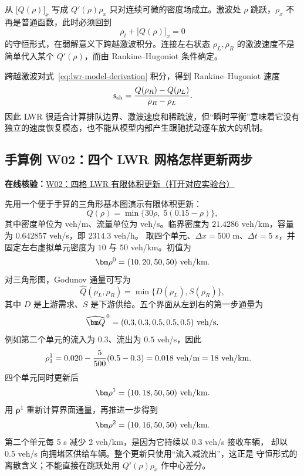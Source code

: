 \documentclass[11pt,a4paper,openany]{book}
\numberwithin{equation}{chapter}
\numberwithin{figure}{chapter}
\numberwithin{table}{chapter}
\newcommand{\onlinelab}[2]{%
  \par\smallskip\noindent
  {\small\sffamily\color{teal}\textbf{在线核验：}\href{https://cwan-ucr.github.io/traffic-stability-book/lab/?case=#1}{#2（打开对应实验台）}}%
  \par\smallskip}
\begin{document}
\begin{tcolorbox}[notebox,title=\textbf{为什么还必须保留守恒形式？}]
从 $\bigl[Q(\rho)\bigr]_x$ 写成 $Q'(\rho)\rho_x$ 只对连续可微的密度场成立。激波处 $\rho$ 跳跃，$\rho_x$ 不再是普通函数，此时必须回到
\[
\rho_t+\bigl[Q(\rho)\bigr]_x=0
\]
的守恒形式，在弱解意义下跨越激波积分。连接左右状态 $\rho_L,\rho_R$ 的激波速度不是简单代入某个 $Q'(\rho)$，而由 Rankine--Hugoniot 条件确定。
\end{tcolorbox}
跨越激波对式~\eqref{eq:lwr-model-derivation} 积分，得到 Rankine--Hugoniot 速度
\begin{equation}
s_{\rm sh}
=\frac{Q(\rho_R)-Q(\rho_L)}{\rho_R-\rho_L}.
\label{eq:lwr-rh-model}
\end{equation}
因此 LWR 很适合计算排队边界、激波速度和稀疏波，但“瞬时平衡”意味着它没有独立的速度恢复模态，也不能从模型内部产生跟驰扰动逐车放大的机制。

\subsection{手算例 W02：四个 LWR 网格怎样更新两步}
\onlinelab{W02}{W02：四格 LWR 有限体积更新}
\label{sub:worked-lwr}

先用一个便于手算的三角形基本图演示有限体积更新：
\begin{equation}
Q(\rho)=\min\{30\rho,\;5(0.15-\rho)\},
\label{eq:w02-triangular-fd}
\end{equation}
其中密度单位为 veh/m、流量单位为 veh/s。临界密度为
$21.4286$ veh/km，容量为 $0.642857$ veh/s，即 $2314.3$ veh/h。
取四个单元、$\Delta x=500$ m、$\Delta t=5$ s，并固定左右虚拟单元密度为
$10$ 与 $50$ veh/km。初值为
\begin{equation}
\bm\rho^0=(10,20,50,50)\ {\rm veh/km}.
\label{eq:w02-initial}
\end{equation}
对三角形图，Godunov 通量可写为
\[
\widehat Q(\rho_L,\rho_R)=\min\{D(\rho_L),S(\rho_R)\},
\]
其中 $D$ 是上游需求、$S$ 是下游供给。五个界面从左到右的第一步通量为
\begin{equation}
\widehat{\bm Q}^{\,0}=(0.3,0.3,0.5,0.5,0.5)\ {\rm veh/s}.
\label{eq:w02-first-flux}
\end{equation}
例如第二个单元的流入为 $0.3$、流出为 $0.5$ veh/s，因此
\begin{align}
\rho_1^1
&=0.020-\frac{5}{500}(0.5-0.3)
=0.018\ {\rm veh/m}
=18\ {\rm veh/km}.
\label{eq:w02-cell-update}
\end{align}
四个单元同时更新后
\[
\bm\rho^1=(10,18,50,50)\ {\rm veh/km}.
\]
用 $\bm\rho^1$ 重新计算界面通量，再推进一步得到
\begin{equation}
\bm\rho^2=(10,16,50,50)\ {\rm veh/km}.
\label{eq:w02-second-update}
\end{equation}
第二个单元每 5 s 减少 2 veh/km，是因为它持续以 $0.3$ veh/s 接收车辆，
却以 $0.5$ veh/s 向拥堵区供给车辆。整个更新只使用“流入减流出”，这正是
守恒形式的离散含义；不能直接在跳跃处用 $Q'(\rho)\rho_x$ 作中心差分。
\end{document}
